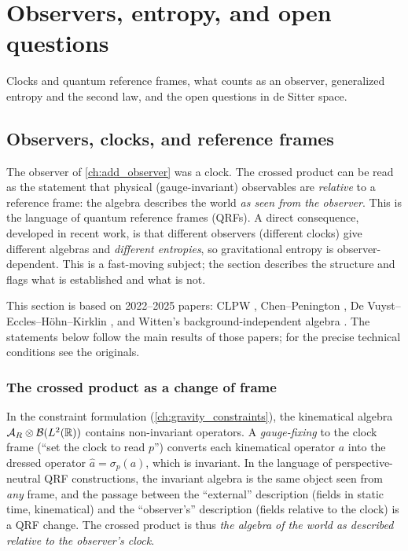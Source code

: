 \chapter{Observers, entropy, and open questions}\label{ch:observers}

Clocks and quantum reference frames, what counts as an observer, generalized entropy and the second law, and the open questions in de Sitter space.

\section{Observers, clocks, and reference frames}\label{ch:clocks_qrf}

\begin{physmotiv}
The observer of \cref{ch:add_observer} was a clock. The crossed product can be read as the statement that physical (gauge-invariant) observables are \emph{relative} to a reference frame: the algebra describes the world \emph{as seen from the observer}. This is the language of quantum reference frames (QRFs). A direct consequence, developed in recent work, is that different observers (different clocks) give different algebras and \emph{different entropies}, so gravitational entropy is observer-dependent. This is a fast-moving subject; the section describes the structure and flags what is established and what is not.
\end{physmotiv}

\begin{unsettled}
This section is based on 2022--2025 papers: CLPW \cite{CLPW2023}, Chen--Penington \cite{ChenPenington2024}, De Vuyst--Eccles--H\"ohn--Kirklin \cite{DEHK2024a,DEHK2024b}, and Witten's background-independent algebra \cite{Witten2023bg}. The statements below follow the main results of those papers; for the precise technical conditions see the originals.
\end{unsettled}

\subsection{The crossed product as a change of frame}

In the constraint formulation (\cref{ch:gravity_constraints}), the kinematical algebra $\mathcal{A}_R\otimes\mathcal{B}(L^2(\mathbb{R}))$ contains non-invariant operators. A \emph{gauge-fixing} to the clock frame (``set the clock to read $p$'') converts each kinematical operator $a$ into the dressed operator $\hat a=\sigma_p(a)$, which is invariant. In the language of perspective-neutral QRF constructions, the invariant algebra is the same object seen from \emph{any} frame, and the passage between the ``external'' description (fields in static time, kinematical) and the ``observer's'' description (fields relative to the clock) is a QRF change. The crossed product is thus \emph{the algebra of the world as described relative to the observer's clock}.

